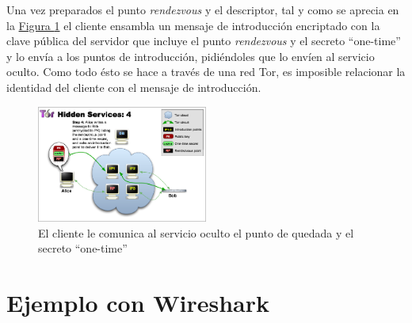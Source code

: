 \documentclass[10pt,a4paper,spanish]{article}
\begin{document}
Una vez preparados el punto \textit{rendezvous} y el descriptor, tal y como se aprecia en la \hyperref[ths4]{Figura \ref*{ths4}} el cliente ensambla un mensaje de introducción encriptado con la clave pública del servidor que incluye el punto \textit{rendezvous} y el secreto ``one-time'' y lo envía a los puntos de introducción, pidiéndoles que lo envíen al servicio oculto. Como todo ésto se hace a través de una red Tor, es imposible relacionar la identidad del cliente con el mensaje de introducción.

\begin{figure}[!h]
    \centering
    \includegraphics[width=0.5\textwidth]{THS-4}
    \caption{El cliente le comunica al servicio oculto el punto de quedada y el secreto ``one-time''}
    \label{ths4}
\end{figure}


\section{Ejemplo con Wireshark}

\end{document}

